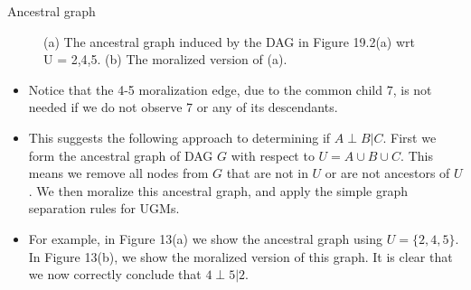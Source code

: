 \documentclass[10pt,mathserif]{beamer}
\begin{document}
\begin{frame}{Ancestral graph}
\begin{figure}[h]
\centering     %
{}
\caption{(a) The ancestral graph induced by the DAG in Figure 19.2(a) wrt U = {2,4,5}. (b) The moralized version of (a).}
\end{figure}

\begin{itemize}
    \item Notice that the 4-5 moralization edge, due to the common child 7, is not needed if we do not observe 7 or any of its descendants.
    \item This suggests the following approach to determining if
    $A \perp B|C$. First we form the ancestral graph of DAG $G$ with respect to $U = A \cup B  \cup C$. This means we remove all nodes from $G$ that are not in $U$ or are not ancestors of $U$. We then moralize this ancestral graph, and apply the simple graph separation rules for UGMs.
    \item For example, in Figure 13(a) we show the ancestral graph using $U = \{2, 4, 5\}$. In Figure 13(b), we show the moralized version of this graph. It is clear that we now correctly conclude that $4 \perp 5|2$. 
\end{itemize}
\end{frame}
\end{document}
